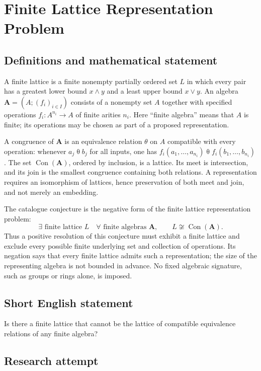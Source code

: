 \documentclass[11pt,a4paper]{article}
\begin{document}
\section*{Finite Lattice Representation Problem}\label{statement}

\subsection{Definitions and mathematical statement}
A finite lattice is a finite nonempty partially ordered set $L$ in which every
pair has a greatest lower bound $x\wedge y$ and a least upper bound $x\vee y$.
An algebra $\mathbf A=(A;(f_i)_{i\in I})$ consists of a nonempty set $A$ together
with specified operations $f_i:A^{n_i}\to A$ of finite arities $n_i$.
Here ``finite algebra'' means that $A$ is finite; its operations may be chosen
as part of a proposed representation.

A congruence of $\mathbf A$ is an equivalence relation $\theta$ on $A$ compatible
with every operation: whenever $a_j\mathrel\theta b_j$ for all inputs, one has
$f_i(a_1,\ldots,a_{n_i})\mathrel\theta f_i(b_1,\ldots,b_{n_i})$.
The set $\operatorname{Con}(\mathbf A)$, ordered by inclusion, is a lattice.
Its meet is intersection, and its join is the smallest congruence containing
both relations. A representation requires an isomorphism of lattices, hence
preservation of both meet and join, and not merely an embedding.

The catalogue conjecture is the negative form of the finite lattice
representation problem:
\[
 \exists\text{ finite lattice }L\quad
 \forall\text{ finite algebras }\mathbf A,\qquad
 L\not\cong\operatorname{Con}(\mathbf A).
\]
Thus a positive resolution of this conjecture must exhibit a finite lattice
and exclude every possible finite underlying set and collection of operations.
Its negation says that every finite lattice admits such a representation;
the size of the representing algebra is not bounded in advance. No fixed
algebraic signature, such as groups or rings alone, is imposed.
\subsection{Short English statement}
Is there a finite lattice that cannot be the lattice of compatible equivalence relations of any finite algebra?
\subsection{Research attempt}
\end{document}
